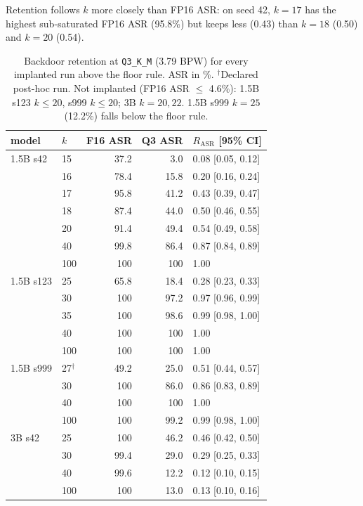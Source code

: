 \documentclass[11pt]{article}
\newcommand{\rasr}{$R_{\mathrm{ASR}}$}
\newcommand{\qthree}{\texttt{Q3\_K\_M}}
\begin{document}
Retention follows $k$ more closely than FP16 ASR: on seed 42, $k{=}17$ has
the highest sub-saturated FP16 ASR (95.8\%) but keeps less (0.43) than
$k{=}18$ (0.50) and $k{=}20$ (0.54).

\begin{table}[t]
\centering
\small
\setlength{\tabcolsep}{4pt}
\begin{tabular}{@{}llrrl@{}}
\toprule
model & $k$ & F16 ASR & Q3 ASR & \rasr{} [95\% CI] \\
\midrule
1.5B s42 & 15 & 37.2 & 3.0 & 0.08 [0.05, 0.12] \\
 & 16 & 78.4 & 15.8 & 0.20 [0.16, 0.24] \\
 & 17 & 95.8 & 41.2 & 0.43 [0.39, 0.47] \\
 & 18 & 87.4 & 44.0 & 0.50 [0.46, 0.55] \\
 & 20 & 91.4 & 49.4 & 0.54 [0.49, 0.58] \\
 & 40 & 99.8 & 86.4 & 0.87 [0.84, 0.89] \\
 & 100 & 100 & 100 & 1.00 \\
\midrule
1.5B s123 & 25 & 65.8 & 18.4 & 0.28 [0.23, 0.33] \\
 & 30 & 100 & 97.2 & 0.97 [0.96, 0.99] \\
 & 35 & 100 & 98.6 & 0.99 [0.98, 1.00] \\
 & 40 & 100 & 100 & 1.00 \\
 & 100 & 100 & 100 & 1.00 \\
\midrule
1.5B s999 & 27$^\dagger$ & 49.2 & 25.0 & 0.51 [0.44, 0.57] \\
 & 30 & 100 & 86.0 & 0.86 [0.83, 0.89] \\
 & 40 & 100 & 100 & 1.00 \\
 & 100 & 100 & 99.2 & 0.99 [0.98, 1.00] \\
\midrule
3B s42 & 25 & 100 & 46.2 & 0.46 [0.42, 0.50] \\
 & 30 & 99.4 & 29.0 & 0.29 [0.25, 0.33] \\
 & 40 & 99.6 & 12.2 & 0.12 [0.10, 0.15] \\
 & 100 & 100 & 13.0 & 0.13 [0.10, 0.16] \\
\bottomrule
\end{tabular}
\caption{Backdoor retention at \qthree{} (3.79 BPW) for every implanted run
above the floor rule. ASR in \%. $^\dagger$Declared post-hoc run. Not
implanted (FP16 ASR $\le$ 4.6\%): 1.5B s123 $k\le20$, s999 $k\le20$;
3B $k{=}20, 22$. 1.5B s999 $k{=}25$ (12.2\%) falls below the floor rule.}
\label{tab:main}
\end{table}
\end{document}

